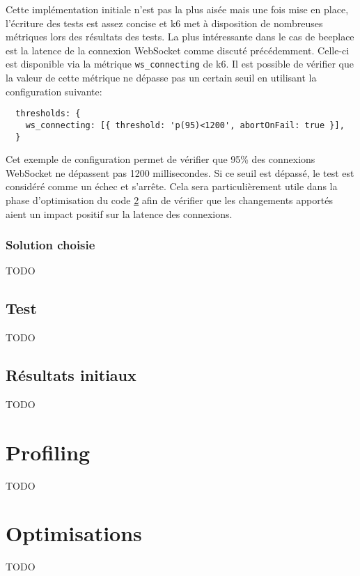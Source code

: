 Cette implémentation initiale n'est pas la plus aisée mais une fois mise en place, l'écriture des tests est assez concise et k6 met à disposition de nombreuses métriques lors des résultats des tests. La plus intéressante dans le cas de \gls{beeplace} est la latence de la connexion WebSocket comme discuté précédemment. Celle-ci est disponible via la métrique \texttt{ws_connecting} de k6. Il est possible de vérifier que la valeur de cette métrique ne dépasse pas un certain seuil en utilisant la configuration suivante:

\begin{verbatim}
  thresholds: {
    ws_connecting: [{ threshold: 'p(95)<1200', abortOnFail: true }],
  }
\end{verbatim}

Cet exemple de configuration permet de vérifier que 95\% des connexions WebSocket ne dépassent pas 1200 millisecondes. Si ce seuil est dépassé, le test est considéré comme un échec et s'arrête. Cela sera particulièrement utile dans la phase d'optimisation du code \ref{sec:optimisations} afin de vérifier que les changements apportés aient un impact positif sur la latence des connexions.

\subsubsection{Solution choisie}

TODO


\subsection{Test}

TODO

\subsection{Résultats initiaux}

TODO

\section{Profiling}

TODO

\section{Optimisations}
\label{sec:optimisations}

TODO